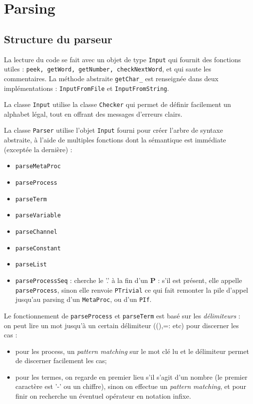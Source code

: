 \documentclass[11pt]{article} %
\begin{document}
\section{Parsing}

\subsection{Structure du parseur}

La lecture du code se fait avec un objet de type \texttt{Input} qui fournit des fonctions utiles : \texttt{peek, getWord, getNumber, checkNextWord}, et qui saute les commentaires.
La méthode abstraite \texttt{getChar\_} est renseignée dans deux implémentations : \texttt{InputFromFile} et \texttt{InputFromString}.

La classe \texttt{Input} utilise la classe \texttt{Checker} qui permet de définir facilement un alphabet légal, tout en  offrant des messages d'erreurs clairs.

La classe \texttt{Parser} utilise l'objet \texttt{Input} fourni pour créer l'arbre de syntaxe abstraite, à l'aide de multiples fonctions dont la sémantique est immédiate (exceptée la dernière) : 
\begin{itemize}
\item \texttt{parseMetaProc} 
\item \texttt{parseProcess}
\item \texttt{parseTerm}
\item \texttt{parseVariable}
\item \texttt{parseChannel}
\item \texttt{parseConstant}
\item \texttt{parseList}
\item \texttt{parseProcessSeq} : cherche le '.' à la fin d'un \textbf{P} : s'il est présent, elle appelle \texttt{parseProcess}, sinon elle renvoie \texttt{PTrivial} ce qui fait remonter la pile d'appel jusqu'au parsing d'un \texttt{MetaProc}, ou d'un \texttt{PIf}.
\end{itemize}

Le fonctionnement de \texttt{parseProcess} et \texttt{parseTerm} est basé sur les \emph{délimiteurs} : on peut lire un mot jusqu'à un certain délimiteur ((),=: etc) pour discerner les cas :
\begin{itemize}
\item pour les process, un \emph{pattern matching} sur le mot clé lu et le délimiteur permet de discerner facilement les cas;
\item pour les termes, on regarde en premier lieu s'il s'agit d'un nombre (le premier caractère est '-' ou un chiffre), sinon on effectue un \emph{pattern matching}, et pour finir on recherche un éventuel opérateur en notation infixe.
\end{itemize}
\end{document}
